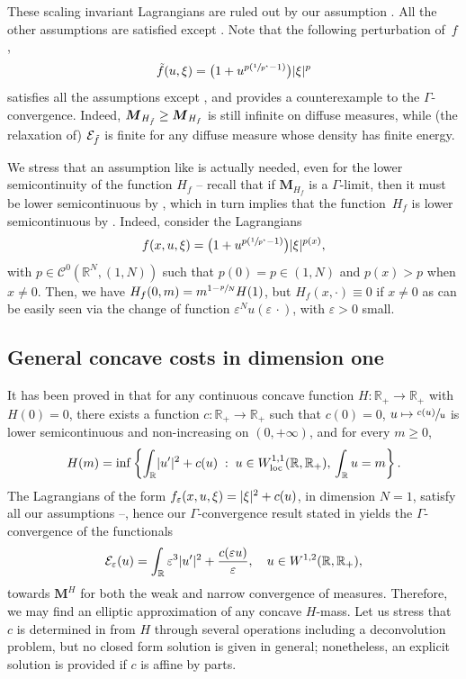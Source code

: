 \documentclass[10pt]{amsart}
\theoremstyle{plain}
\theoremstyle{definition}
\newcommand{\R}{\mathbb{R}}
\newcommand{\Cspace}{\mathscr{C}}
\newcommand{\ener}{\mathcal{E}}
\newcommand{\mass}{\boldsymbol{M}}
\newcommand{\loc}{\mathrm{loc}}
\newcommand{\eps}{\varepsilon}
\newcommand{\st}{\;:\;}
\DeclarePairedDelimiter{\abs}{\lvert}{\rvert}
\begin{document}
These scaling invariant Lagrangians are ruled out by our assumption . All the other assumptions are satisfied except . Note that the following perturbation of~\(f\),
\[
\Tilde{f}(u,\xi)=\bigl(1+u^{p(\sfrac{1}{p^\star}-1)}\bigr)\abs{\xi}^p
\]
satisfies all the assumptions except , and provides a counterexample to the \(\Gamma\)\nobreakdash-con\-vergence. Indeed, \(\mass_{H_{\Tilde{f}}}\geq \mass_{H_f}\) is still infinite on diffuse measures, while (the relaxation of) \(\ener_{\Tilde{f}}\) is finite for any diffuse measure whose density has finite energy.

We stress that an assumption like  is actually needed, even for the lower semicontinuity of the function \(H_f\) -- recall that if \(\mass_{H_f}\) is a \(\Gamma\)-limit, then it must be lower semicontinuous by \cite[Prop.\,1.28]{braidesGammaConvergenceBeginners2002}, which in turn implies that the function~\(H_f\) is lower semicontinuous by . Indeed, consider the Lagrangians
\[
f(x,u,\xi)=\bigl(1+u^{p(\sfrac{1}{p^\star}-1)}\bigr)\abs{\xi}^{p(x)},
\]
with \(p\in\Cspace^0(\R^N,(1,N))\) such that \(p(0)=p\in (1,N)\) and \(p(x)>p\) when \(x\neq 0\). Then, we have \(H_f(0,m)=m^{1-\sfrac{p}{N}}H(1)\), but \(H_f(x,\cdot)\equiv 0\) if \(x\neq 0\) as can be easily seen via the change of function \(\eps^N u(\eps\,\cdot)\), with \(\eps>0\) small.

\subsection{General concave costs in dimension one}\label{generalCosts1d}

It has been proved in \cite{wirthPhaseFieldModels2019} that for any continuous concave function \(H:\R_+\to\R_+\) with \(H(0)=0\), there exists a function \(c:\R_+\to\R_+\) such that \(c(0)=0\), \(u\mapsto \sfrac{c(u)}{u}\) is lower semicontinuous and non-increasing on \((0,+\infty)\), and for every $m \geq 0$,
\[
H(m)=\inf\left\{\int_\R\abs{u'}^2+c(u)\st u\in W^{1,1}_\loc(\R,\R_+),\,\int_\R u=m\right\}.
\]
The Lagrangians of the form \(f_\eps(x,u,\xi)=\abs{\xi}^2+c(u)\), in dimension \(N=1\), satisfy all our assumptions --, hence our \(\Gamma\)-convergence result stated in  yields the \(\Gamma\)-convergence of the functionals
\[
\ener_\eps(u)=\int_\R\eps^3\abs{u'}^2+\frac{c(\eps u)}{\eps},\quad u\in W^{1,2}(\R,\R_+),
\]
towards \(\mass^{H}\) for both the weak and narrow convergence of measures. Therefore, we may find an elliptic approximation of any concave $H$-mass. Let us stress that $c$ is determined in \cite{wirthPhaseFieldModels2019} from $H$ through several operations including a deconvolution problem, but no closed form solution is given in general; nonetheless, an explicit solution is provided if $c$ is affine by parts.
\end{document}
